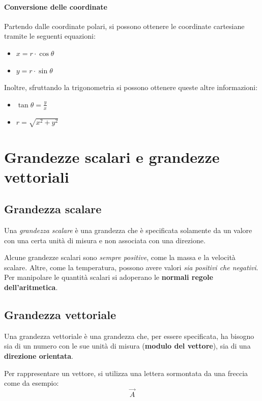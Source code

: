 \documentclass[12pt,oneside]{book}
\begin{document}
\paragraph{Conversione delle coordinate} Partendo dalle coordinate polari, si possono ottenere le coordinate cartesiane
tramite le seguenti equazioni:
\begin{itemize}
    \item $x = r \cdot \cos{\theta}$
    \item $y = r \cdot \sin{\theta}$
\end{itemize}
Inoltre, sfruttando la trigonometria si possono ottenere queste altre informazioni:
\begin{itemize}
    \item $\tan{\theta} = \frac{y}{x}$
    \item $r = \sqrt{x^2 + y^2}$
\end{itemize}

\section{Grandezze scalari e grandezze vettoriali}

\subsection{Grandezza scalare}
Una \emph{grandezza scalare} è una grandezza che è specificata solamente da un valore con una certa unità di misura e non associata con una direzione.

Alcune grandezze scalari sono \emph{sempre positive}, come la massa e la velocità scalare.
Altre, come la temperatura, possono avere valori \emph{sia positivi che negativi}.
Per manipolare le quantità scalari si adoperano le \textbf{normali regole dell’aritmetica}.

\subsection{Grandezza vettoriale}
Una grandezza vettoriale è una grandezza che, per essere specificata,
ha bisogno sia di un numero con le sue unità di misura (\textbf{modulo del vettore}), sia di una \textbf{direzione orientata}.

Per rappresentare un vettore, si utilizza una lettera sormontata da una freccia come da esempio:
\begin{equation*}
    \vec{A}
\end{equation*}
\end{document}
